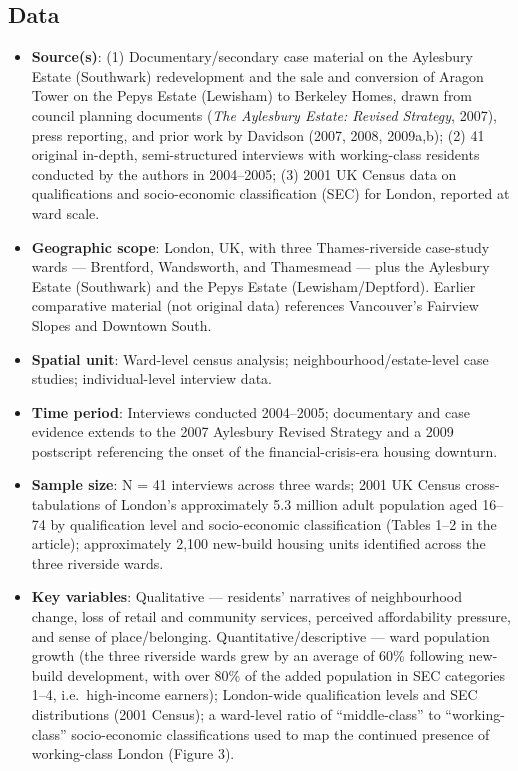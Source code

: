 \subsection*{Data}

\begin{itemize}
  \item \textbf{Source(s)}: (1) Documentary/secondary case material on the Aylesbury Estate (Southwark) redevelopment and the sale and conversion of Aragon Tower on the Pepys Estate (Lewisham) to Berkeley Homes, drawn from council planning documents (\textit{The Aylesbury Estate: Revised Strategy}, 2007), press reporting, and prior work by Davidson (2007, 2008, 2009a,b); (2) 41 original in-depth, semi-structured interviews with working-class residents conducted by the authors in 2004--2005; (3) 2001 UK Census data on qualifications and socio-economic classification (SEC) for London, reported at ward scale.
  \item \textbf{Geographic scope}: London, UK, with three Thames-riverside case-study wards --- Brentford, Wandsworth, and Thamesmead --- plus the Aylesbury Estate (Southwark) and the Pepys Estate (Lewisham/Deptford). Earlier comparative material (not original data) references Vancouver's Fairview Slopes and Downtown South.
  \item \textbf{Spatial unit}: Ward-level census analysis; neighbourhood/estate-level case studies; individual-level interview data.
  \item \textbf{Time period}: Interviews conducted 2004--2005; documentary and case evidence extends to the 2007 Aylesbury Revised Strategy and a 2009 postscript referencing the onset of the financial-crisis-era housing downturn.
  \item \textbf{Sample size}: N = 41 interviews across three wards; 2001 UK Census cross-tabulations of London's approximately 5.3 million adult population aged 16--74 by qualification level and socio-economic classification (Tables 1--2 in the article); approximately 2,100 new-build housing units identified across the three riverside wards.
  \item \textbf{Key variables}: Qualitative --- residents' narratives of neighbourhood change, loss of retail and community services, perceived affordability pressure, and sense of place/belonging. Quantitative/descriptive --- ward population growth (the three riverside wards grew by an average of 60\% following new-build development, with over 80\% of the added population in SEC categories 1--4, i.e.\ high-income earners); London-wide qualification levels and SEC distributions (2001 Census); a ward-level ratio of ``middle-class'' to ``working-class'' socio-economic classifications used to map the continued presence of working-class London (Figure 3).

\end{itemize}
